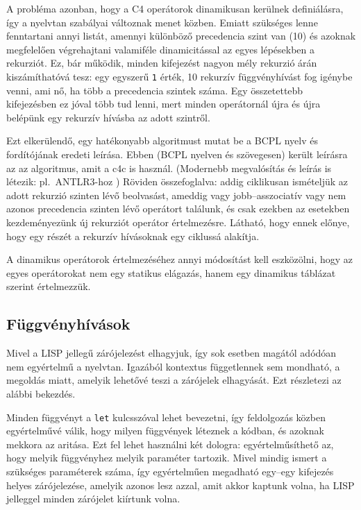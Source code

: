 \documentclass[magyar,12pt,a4paper,final,titlepage]{report}
\def\inlcode#1{{\color{inline-code-color}\tt #1}}
\def\pl{pl.\ }
\begin{document}
    A probléma azonban, hogy a C4 operátorok dinamikusan kerülnek definiálásra, így a nyelvtan szabályai változnak menet közben.
    Emiatt szükséges lenne fenntartani annyi listát, amennyi különböző precedencia szint van (10) és azoknak megfelelően végrehajtani valamiféle dinamicitással az egyes lépésekben a rekurziót.
    Ez, bár működik, minden kifejezést nagyon mély rekurzió árán kiszámíthatóvá tesz: egy egyszerű {\tt 1} érték, 10 rekurzív függvényhívást fog igénybe venni, ami nő, ha több a precedencia szintek száma.
    Egy összetettebb kifejezésben ez jóval több tud lenni, mert minden operátornál újra és újra belépünk egy rekurzív hívásba az adott szintről.

    Ezt elkerülendő, egy hatékonyabb algoritmust mutat be a BCPL nyelv és fordítójának eredeti leírása. \cite{richards_basic_1984}
    Ebben (BCPL nyelven és szövegesen) került leírásra az az algoritmus, amit a c4c is használ.
    (Modernebb megvalósítás és leírás is létezik: \pl ANTLR3-hoz \cite{sam_harwell_operator_2008})
    Röviden összefoglalva: addig ciklikusan ismételjük az adott rekurzió szinten lévő beolvasást, ameddig vagy jobb--asszociatív vagy nem azonos precedencia szinten lévő operátort találunk, és csak ezekben az esetekben kezdeményezünk új rekurziót operátor értelmezésre.
    Látható, hogy ennek előnye, hogy egy részét a rekurzív hívásoknak egy ciklussá alakítja.

    A dinamikus operátorok értelmezéséhez annyi módosítást kell eszközölni, hogy az egyes operátorokat nem egy statikus elágazás, hanem egy dinamikus táblázat szerint értelmezzük.

    \subsection{Függvényhívások}

    Mivel a LISP jellegű zárójelezést elhagyjuk, így sok esetben magától adódóan nem egyértelmű a nyelvtan.
    Igazából kontextus függetlennek sem mondható, a megoldás miatt, amelyik lehetővé teszi a zárójelek elhagyását.
    Ezt részletezi az alábbi bekezdés.

    Minden függvényt a \inlcode{let} kulcsszóval lehet bevezetni, így feldolgozás közben egyértelművé válik, hogy milyen függvények léteznek a kódban, és azoknak mekkora az aritása.
    Ezt fel lehet használni két dologra: egyértelműsíthető az, hogy melyik függvényhez melyik paraméter tartozik.
    Mivel mindig ismert a szükséges paraméterek száma, így egyértelműen megadható egy--egy kifejezés helyes zárójelezése, amelyik azonos lesz azzal, amit akkor kaptunk volna, ha LISP jelleggel minden zárójelet kiírtunk volna.
\end{document}
